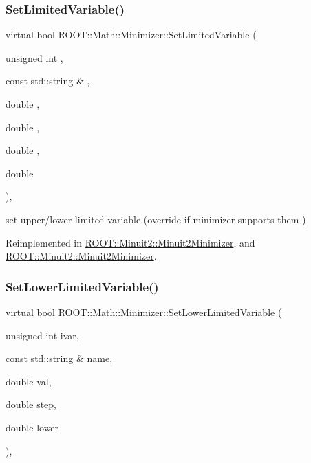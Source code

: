 \subsubsection{\texorpdfstring{SetLimitedVariable()}{SetLimitedVariable()}\hspace{0.1cm}{\footnotesize\ttfamily [2/2]}}
{\footnotesize\ttfamily virtual bool R\+O\+O\+T\+::\+Math\+::\+Minimizer\+::\+Set\+Limited\+Variable (\begin{DoxyParamCaption}\item[{unsigned int}]{,  }\item[{const std\+::string \&}]{,  }\item[{double}]{,  }\item[{double}]{,  }\item[{double}]{,  }\item[{double}]{ }\end{DoxyParamCaption})\hspace{0.3cm}{\ttfamily [inline]}, {\ttfamily [virtual]}}



set upper/lower limited variable (override if minimizer supports them ) 



Reimplemented in \mbox{\hyperlink{classROOT_1_1Minuit2_1_1Minuit2Minimizer_a30385295df6a6b784aa59de7f00e4d23}{R\+O\+O\+T\+::\+Minuit2\+::\+Minuit2\+Minimizer}}, and \mbox{\hyperlink{classROOT_1_1Minuit2_1_1Minuit2Minimizer_a30385295df6a6b784aa59de7f00e4d23}{R\+O\+O\+T\+::\+Minuit2\+::\+Minuit2\+Minimizer}}.

\mbox{\label{classROOT_1_1Math_1_1Minimizer_a0fed20bdc58d05ce2b92d2bf47594dfb}} 
\subsubsection{\texorpdfstring{SetLowerLimitedVariable()}{SetLowerLimitedVariable()}\hspace{0.1cm}{\footnotesize\ttfamily [1/2]}}
{\footnotesize\ttfamily virtual bool R\+O\+O\+T\+::\+Math\+::\+Minimizer\+::\+Set\+Lower\+Limited\+Variable (\begin{DoxyParamCaption}\item[{unsigned int}]{ivar,  }\item[{const std\+::string \&}]{name,  }\item[{double}]{val,  }\item[{double}]{step,  }\item[{double}]{lower }\end{DoxyParamCaption})\hspace{0.3cm}{\ttfamily [inline]}, {\ttfamily [virtual]}}



